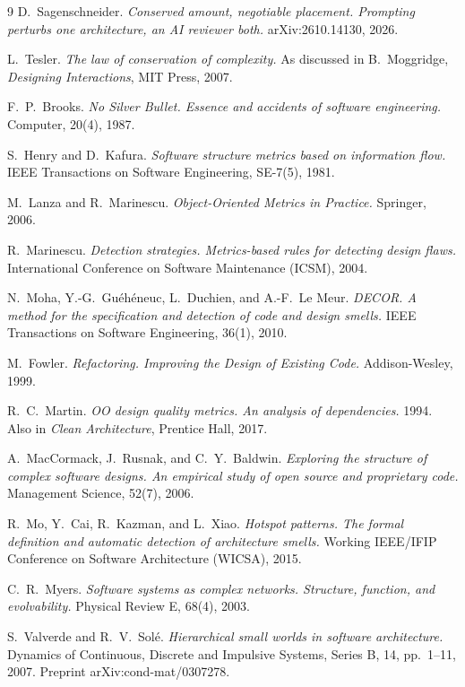 \documentclass[11pt,a4paper]{article}
\begin{document}
\begin{thebibliography}{9}
D.~Sagenschneider.
\emph{Conserved amount, negotiable placement. Prompting perturbs one architecture,
an AI reviewer both.}
arXiv:2610.14130, 2026.

L.~Tesler.
\emph{The law of conservation of complexity.}
As discussed in B.~Moggridge, \emph{Designing Interactions}, MIT Press, 2007.

F.~P.~Brooks.
\emph{No Silver Bullet. Essence and accidents of software engineering.}
Computer, 20(4), 1987.

S.~Henry and D.~Kafura.
\emph{Software structure metrics based on information flow.}
IEEE Transactions on Software Engineering, SE-7(5), 1981.

M.~Lanza and R.~Marinescu.
\emph{Object-Oriented Metrics in Practice.}
Springer, 2006.

R.~Marinescu.
\emph{Detection strategies. Metrics-based rules for detecting design flaws.}
International Conference on Software Maintenance (ICSM), 2004.

N.~Moha, Y.-G.~Gu\'eh\'eneuc, L.~Duchien, and A.-F.~Le Meur.
\emph{DECOR. A method for the specification and detection of code and design
smells.}
IEEE Transactions on Software Engineering, 36(1), 2010.

M.~Fowler.
\emph{Refactoring. Improving the Design of Existing Code.}
Addison-Wesley, 1999.

R.~C.~Martin.
\emph{OO design quality metrics. An analysis of dependencies.}
1994. Also in \emph{Clean Architecture}, Prentice Hall, 2017.

A.~MacCormack, J.~Rusnak, and C.~Y.~Baldwin.
\emph{Exploring the structure of complex software designs. An empirical study of
open source and proprietary code.}
Management Science, 52(7), 2006.

R.~Mo, Y.~Cai, R.~Kazman, and L.~Xiao.
\emph{Hotspot patterns. The formal definition and automatic detection of
architecture smells.}
Working IEEE/IFIP Conference on Software Architecture (WICSA), 2015.

C.~R.~Myers.
\emph{Software systems as complex networks. Structure, function, and evolvability.}
Physical Review E, 68(4), 2003.

S.~Valverde and R.~V.~Sol\'e.
\emph{Hierarchical small worlds in software architecture.}
Dynamics of Continuous, Discrete and Impulsive Systems, Series B, 14, pp.~1--11,
2007. Preprint arXiv:cond-mat/0307278.


\end{thebibliography}
\end{document}
